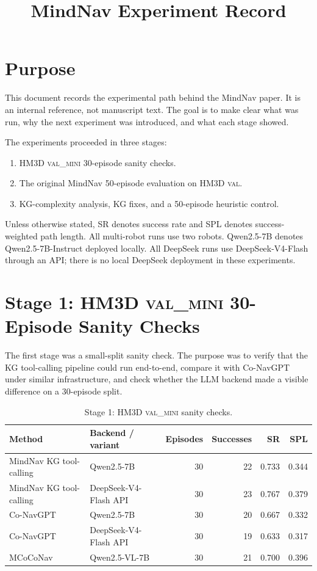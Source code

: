 \documentclass[11pt]{article}
\title{MindNav Experiment Record}
\author{}
\date{}
\newcommand{\tablefont}{\footnotesize}
\begin{document}
\maketitle

\section{Purpose}

This document records the experimental path behind the MindNav paper. It is an
internal reference, not manuscript text. The goal is to make clear what was run,
why the next experiment was introduced, and what each stage showed.

The experiments proceeded in three stages:
\begin{enumerate}
    \item HM3D \textsc{val\_mini} 30-episode sanity checks.
    \item The original MindNav 50-episode evaluation on HM3D \textsc{val}.
    \item KG-complexity analysis, KG fixes, and a 50-episode heuristic control.
\end{enumerate}

Unless otherwise stated, SR denotes success rate and SPL denotes
success-weighted path length. All multi-robot runs use two robots.
Qwen2.5-7B denotes Qwen2.5-7B-Instruct deployed locally. All DeepSeek runs use
DeepSeek-V4-Flash through an API; there is no local DeepSeek deployment in
these experiments.

\section{Stage 1: HM3D \textsc{val\_mini} 30-Episode Sanity Checks}

The first stage was a small-split sanity check. The purpose was to verify that
the KG tool-calling pipeline could run end-to-end, compare it with Co-NavGPT
under similar infrastructure, and check whether the LLM backend made a visible
difference on a 30-episode split.

\begin{table}[t]
\centering
\tablefont
\caption{Stage 1: HM3D \textsc{val\_mini} sanity checks.}
\label{tab:stage1-val-mini}
\begin{tabular}{llrrrr}
\hline
Method & Backend / variant & Episodes & Successes & SR & SPL \\
\hline
MindNav KG tool-calling & Qwen2.5-7B & 30 & 22 & 0.733 & 0.344 \\
MindNav KG tool-calling & DeepSeek-V4-Flash API & 30 & 23 & 0.767 & 0.379 \\
Co-NavGPT & Qwen2.5-7B & 30 & 20 & 0.667 & 0.332 \\
Co-NavGPT & DeepSeek-V4-Flash API & 30 & 19 & 0.633 & 0.317 \\
MCoCoNav & Qwen2.5-VL-7B & 30 & 21 & 0.700 & 0.396 \\
\hline
\end{tabular}
\end{table}
\end{document}
